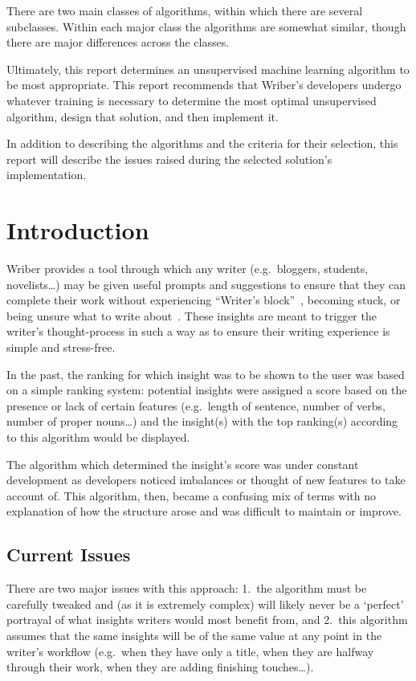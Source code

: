 \documentclass[12pt]{article}
\begin{document}
There are two main classes of algorithms, within which there are several subclasses. Within each major class the algorithms are somewhat similar, though there are major differences across the classes.

Ultimately, this report determines an unsupervised machine learning algorithm to be most appropriate. This report recommends that Wriber's developers undergo whatever training is necessary to determine the most optimal unsupervised algorithm, design that solution, and then implement it.

In addition to describing the algorithms and the criteria for their selection, this report will describe the issues raised during the selected solution's implementation.
\newpage


\toc
\lot


\section{Introduction}
Wriber provides a tool through which any writer (e.g.\ bloggers, students, novelists\dots) may be given useful prompts and suggestions to ensure that they can complete their work without experiencing ``Writer's block''~\cite{kamil}, becoming stuck, or being unsure what to write about~\cite{wriber}. These insights are meant to trigger the writer's thought-process in such a way as to ensure their writing experience is simple and stress-free.

In the past, the ranking for which insight was to be shown to the user was based on a simple ranking system: potential insights were assigned a score based on the presence or lack of certain features (e.g.\ length of sentence, number of verbs, number of proper nouns\dots) and the insight(s) with the top ranking(s) according to this algorithm would be displayed.

The algorithm which determined the insight's score was under constant development as developers noticed imbalances or thought of new features to take account of. This algorithm, then, became a confusing mix of terms with no explanation of how the structure arose and was difficult to maintain or improve.

\subsection{Current Issues}
There are two major issues with this approach: 1.\ the algorithm must be carefully tweaked and (as it is extremely complex) will likely never be a `perfect' portrayal of what insights writers would most benefit from, and 2.\ this algorithm assumes that the same insights will be of the same value at any point in the writer's workflow (e.g.\ when they have only a title, when they are halfway through their work, when they are adding finishing touches\dots).
\end{document}

